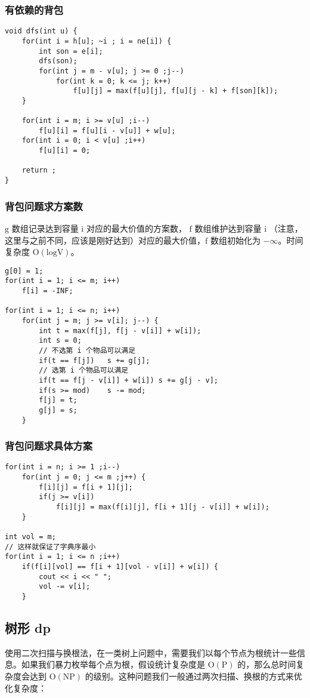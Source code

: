 \documentclass[UTF8]{article}
\begin{document}
\subsubsection{有依赖的背包}
\begin{lstlisting}[caption=有依赖的背包]
void dfs(int u) {
	for(int i = h[u]; ~i ; i = ne[i]) {
		int son = e[i];
		dfs(son);
		for(int j = m - v[u]; j >= 0 ;j--)
			for(int k = 0; k <= j; k++)
				f[u][j] = max(f[u][j], f[u][j - k] + f[son][k]);
	}
    
	for(int i = m; i >= v[u] ;i--)
		f[u][i] = f[u][i - v[u]] + w[u];
	for(int i = 0; i < v[u] ;i++)
		f[u][i] = 0;
    
	return ;
}
\end{lstlisting}


\subsubsection{背包问题求方案数}
$\mathrm{g}$ 数组记录达到容量 $\mathrm{i}$ 对应的最大价值的方案数， $\mathrm{f}$ 数组维护达到容量 $\mathrm{i}$ （注意，这里与之前不同，应该是刚好达到）对应的最大价值，$\mathrm{f}$ 数组初始化为 $\mathrm{-\infty}$。时间复杂度 $\mathrm{O(logV)}$。
\begin{lstlisting}[caption=背包问题求方案数]
g[0] = 1;
for(int i = 1; i <= m; i++)
	f[i] = -INF;

for(int i = 1; i <= n; i++)
	for(int j = m; j >= v[i]; j--) {
		int t = max(f[j], f[j - v[i]] + w[i]);
		int s = 0;
		// 不选第 i 个物品可以满足
		if(t == f[j])	s += g[j];
		// 选第 i 个物品可以满足
		if(t == f[j - v[i]] + w[i])	s += g[j - v];
		if(s >= mod)	s -= mod;
		f[j] = t;
		g[j] = s;
	}
\end{lstlisting}


\subsubsection{背包问题求具体方案}
\begin{lstlisting}[caption=背包问题求具体方案]
for(int i = n; i >= 1 ;i--)
	for(int j = 0; j <= m ;j++) {
		f[i][j] = f[i + 1][j];
		if(j >= v[i])
			f[i][j] = max(f[i][j], f[i + 1][j - v[i]] + w[i]);
	}

int vol = m;
// 这样就保证了字典序最小
for(int i = 1; i <= n ;i++) 
	if(f[i][vol] == f[i + 1][vol - v[i]] + w[i]) {
		cout << i << " ";
		vol -= v[i];
	}
\end{lstlisting}


\subsection{树形 dp}
使用二次扫描与换根法，在一类树上问题中，需要我们以每个节点为根统计一些信息。如果我们暴力枚举每个点为根，假设统计复杂度是 $\mathrm{O(P)}$ 的，那么总时间复杂度会达到 $\mathrm{O(NP)}$ 的级别。这种问题我们一般通过两次扫描、换根的方式来优化复杂度：
\end{document}
